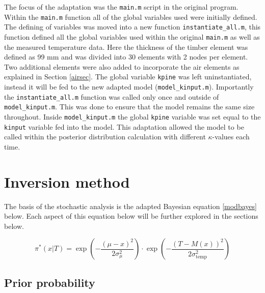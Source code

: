 	The focus of the adaptation was the \texttt{main.m} script in the original program. 
	Within the \texttt{main.m} function all of the global variables used were initially defined.
	The defining of variables was moved into a new function \texttt{instantiate\_all.m}, this function defined all the global variables used within the original \texttt{main.m} as well as the measured temperature data. 
	Here the thickness of the timber element was defined as 99 mm and was divided into 30 elements with 2 nodes per element. 
	Two additional elements were also added to incorporate the air elements as explained in Section \ref{airsec}.
	The global variable \texttt{kpine} was left uninstantiated, instead it will be fed to the new adapted model (\texttt{model\_kinput.m}).
	Importantly the \texttt{instantiate\_all.m} function was called only once and outside of \texttt{model\_kinput.m}.
	This was done to ensure that the model remains the same size throughout.
	Inside \texttt{model\_kinput.m} the global \texttt{kpine} variable was set equal to the \texttt{kinput} variable fed into the model.
	This adaptation allowed the model to be called within the posterior distribution calculation with different $\kappa$-values each time.
	
\section{Inversion method}

%
The basis of the stochastic analysis is the adapted Bayesian equation \ref{modbayes} below. 
Each aspect of this equation below will be further explored in the sections below.

\begin{equation}
\label{modbayes}
\pi^* (x|T) = \exp\left(-\frac{(\mu - x)^2}{2\sigma_{\mu}^2}\right) \cdot \exp\left(-\frac{\left(T-M(x)\right)^2}{2\sigma_{\text{temp}}^2}\right)
\end{equation}

	\subsection{Prior probability}
	
